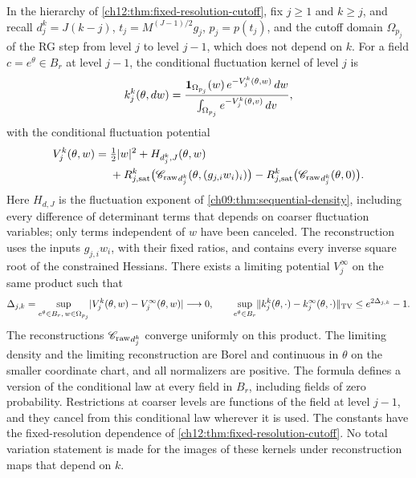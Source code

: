 \begin{theorem}\label{ch12:thm:white-kernel-limit}
In the hierarchy of \cref{ch12:thm:fixed-resolution-cutoff}, fix $j\ge1$ and $k\ge j$, and recall $d_j^k=J(k-j)$, $t_j=M^{(J-1)/2}g_j$, $p_j=p(t_j)$, and the cutoff domain $\Omega_{p_j}$ of the RG step from level $j$ to level $j-1$, which does not depend on $k$. For a field $c=e^\theta\in B_r$ at level $j-1$, the conditional fluctuation kernel of level $j$ is
\[
 k_j^k(\theta,dw)=\frac{\mathbf 1_{\Omega_{p_j}}(w)\,e^{-V_j^k(\theta,w)}\,dw}{\int_{\Omega_{p_j}}e^{-V_j^k(\theta,v)}\,dv},
\]
with the conditional fluctuation potential
\[
 \begin{split}
 V_j^k(\theta,w)={}&\tfrac12\lvert w\rvert^2+H_{d_j^k,J}(\theta,w)\\
 &+R_{j,\mathrm{sat}}^k\bigl({\mathscr C_{\mathrm{raw}}}_{d_j^k}(\theta,(g_{j,i}w_i)_i)\bigr)-R_{j,\mathrm{sat}}^k\bigl({\mathscr C_{\mathrm{raw}}}_{d_j^k}(\theta,0)\bigr).
 \end{split}
\]
Here $H_{d,J}$ is the fluctuation exponent of \cref{ch09:thm:sequential-density}, including every difference of determinant terms that depends on coarser fluctuation variables; only terms independent of $w$ have been canceled. The reconstruction uses the inputs $g_{j,i}w_i$, with their fixed ratios, and contains every inverse square root of the constrained Hessians. There exists a limiting potential $V_j^\infty$ on the same product such that
\[
 \Delta_{j,k}=\sup_{e^\theta\in B_r,\,w\in\Omega_{p_j}}\lvert V_j^k(\theta,w)-V_j^\infty(\theta,w)\rvert\longrightarrow0,
 \qquad
 \sup_{e^\theta\in B_r}\lVert k_j^k(\theta,\cdot)-k_j^\infty(\theta,\cdot)\rVert_{\operatorname{TV}}\le e^{2\Delta_{j,k}}-1 .
\]
The reconstructions ${\mathscr C_{\mathrm{raw}}}_{d_j^k}$ converge uniformly on this product. The limiting density and the limiting reconstruction are Borel and continuous in $\theta$ on the smaller coordinate chart, and all normalizers are positive. The formula defines a version of the conditional law at every field in $B_r$, including fields of zero probability. Restrictions at coarser levels are functions of the field at level $j-1$, and they cancel from this conditional law wherever it is used. The constants have the fixed-resolution dependence of \cref{ch12:thm:fixed-resolution-cutoff}. No total variation statement is made for the images of these kernels under reconstruction maps that depend on $k$.
\end{theorem}

